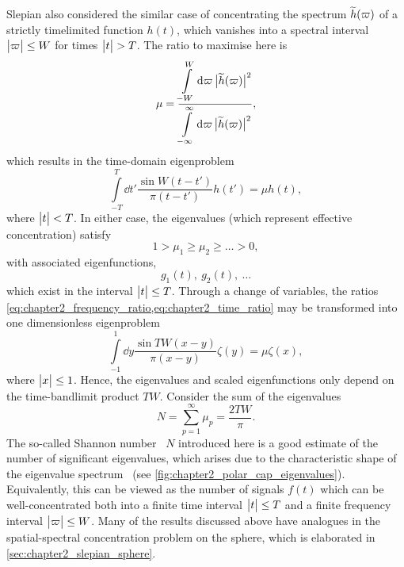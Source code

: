 Slepian \etal{} also considered the similar case of concentrating the spectrum \(\widetilde{h}(\varpi)\) of a strictly timelimited function \(h(t)\), which vanishes into a spectral interval \(\big\lvert\varpi\big\rvert \leq W\) for times \(\big\lvert t\big\rvert > T\).
The ratio to maximise here is
%
\begin{equation}\label{eq:chapter2_time_ratio}
	\mu
	= \frac{\displaystyle\int\limits_{-W}^{W} \dd{\varpi} \big\lvert\widetilde{h}(\varpi)\big\rvert^{2}}
	{\displaystyle\int\limits_{-\infty}^{\infty} \dd{\varpi} \big\lvert\widetilde{h}(\varpi)\big\rvert^{2}},
\end{equation}
%
which results in the time-domain eigenproblem
%
\begin{equation}\label{eq:chapter2_time_eigenproblem}
	\int\limits_{-T}^{T} \dd{t'} \frac{\sin{W(t-t')}}{\pi(t-t')} h(t')
	= \mu h(t),
\end{equation}
%
where \(\big\lvert t\big\rvert < T\).
In either case, the eigenvalues (which represent effective concentration) satisfy
%
\begin{equation}
	1 > \mu_{1} \geq \mu_{2} \geq \ldots > 0, %
\end{equation}
%
with associated eigenfunctions, \eg{}
%
\begin{equation}
	g_{1}(t),\ g_{2}(t),\ \ldots
\end{equation}
%
which exist in the interval \(\big\lvert t\big\rvert \leq T\).
Through a change of variables, the ratios \cref{eq:chapter2_frequency_ratio,eq:chapter2_time_ratio} may be transformed into one dimensionless eigenproblem
%
\begin{equation}
	\int\limits_{-1}^{1} \dd{y} \frac{\sin{TW(x-y)}}{\pi(x-y)} \zeta(y)
	= \mu \zeta(x),
\end{equation}
%
where \(\big\lvert x\big\rvert \leq 1\).
Hence, the eigenvalues and scaled eigenfunctions only depend on the time-bandlimit product \(TW\).
Consider the sum of the eigenvalues
%
\begin{equation}
	N
	= \sum\limits_{p=1}^{\infty} \mu_{p}
	= \frac{2TW}{\pi}.
\end{equation}
%
The so-called Shannon number~\cite{Percival1993} \(N\) introduced here is a good estimate of the number of significant eigenvalues, which arises due to the characteristic shape of the eigenvalue spectrum~\cite{Landau1965,Slepian1965} (see \cref{fig:chapter2_polar_cap_eigenvalues}).
Equivalently, this can be viewed as the number of signals \(f(t)\) which can be well-concentrated both into a finite time interval \(\big\lvert t\big\rvert \leq T\) and a finite frequency interval \(\big\lvert\varpi\big\rvert \leq W\).
Many of the results discussed above have analogues in the spatial-spectral concentration problem on the sphere, which is elaborated in \cref{sec:chapter2_slepian_sphere}.

